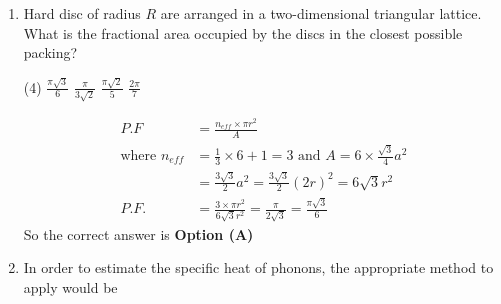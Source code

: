 \begin{enumerate}
\begin{tasks}(4)
\task[\textbf{A.}] $a T^{3}$
\task[\textbf{B.}] $a T+b T^{3}$
\task[\textbf{C.}] $a T^{2}+b T^{3}$
\task[\textbf{D.}] $\exp \left(-\frac{a}{k_{B} T}\right)$
\end{tasks}
\begin{answer}
$$\begin{aligned}
\text{The specific heat of}&\text{ model is sum of electric and phonon specific heat}\\
C&=C_{e}+C_{p h}\\
\text{For }T \ll \theta_{0}: C_{P h}&=b T^{3}\text{ and }C_{e}=a T \therefore C=a T+b T^{3}
\end{aligned}$$
So the correct answer is \textbf{Option (B)}
\end{answer}	\item Hard disc of radius $R$ are arranged in a two-dimensional triangular lattice. What is the fractional area occupied by the discs in the closest possible packing?
{}

\begin{tasks}(4)
\task[\textbf{A.}] $\frac{\pi \sqrt{3}}{6}$
\task[\textbf{B.}]  $\frac{\pi}{3 \sqrt{2}}$
\task[\textbf{C.}] $\frac{\pi \sqrt{2}}{5}$
\task[\textbf{D.}] $\frac{2 \pi}{7}$
\end{tasks}
\begin{answer}
\begin{align*}
P . F&=\frac{n_{e f f} \times \pi r^{2}}{A}\\
\text{where }n_{e f f}&=\frac{1}{3} \times 6+1=3\text{ and }A=6 \times \frac{\sqrt{3}}{4} a^{2}\\&=\frac{3 \sqrt{3}}{2} a^{2}=\frac{3 \sqrt{3}}{2}(2 r)^{2}=6 \sqrt{3} r^{2}\\
P . F .&=\frac{3 \times \pi r^{2}}{6 \sqrt{3} r^{2}}=\frac{\pi}{2 \sqrt{3}}=\frac{\pi \sqrt{3}}{6}
\end{align*}
So the correct answer is \textbf{Option (A)}
\end{answer}
	\item In order to estimate the specific heat of phonons, the appropriate method to apply would be
{}


\end{enumerate}
